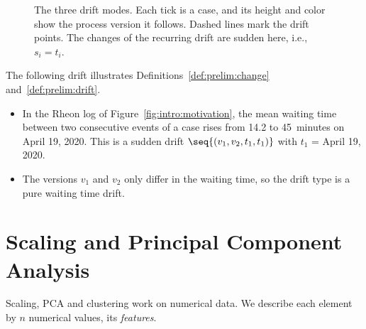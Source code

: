\begin{figure}[tb]
	\caption[The three drift modes]{%
		The three drift modes. Each tick is a case, and its height and color show the process version it follows. Dashed lines mark the drift points. The changes of the recurring drift are sudden here, i.e., $s_i = t_i$.}
	\label{fig:prelim:drift_modes}
\end{figure}

\begin{example}
	\label{ex:prelim:drift}
	The following drift illustrates Definitions~\ref{def:prelim:change} and~\ref{def:prelim:drift}.
	\begin{itemize}
		\item In the Rheon log of Figure~\ref{fig:intro:motivation}, the mean waiting time between two consecutive events of a case rises from 14.2 to 45~minutes on April 19, 2020. This is a sudden drift $\seq{(v_1, v_2, t_1, t_1)}$ with $t_1$ = April 19, 2020.

		\item The versions $v_1$ and $v_2$ only differ in the waiting time, so the drift type is a pure waiting time drift.
	\end{itemize}
\end{example}

\section{Scaling and Principal Component Analysis}
\label{sec:prelim:pca}
Scaling, PCA and clustering work on numerical data. We describe each element by $n$ numerical values, its \emph{features}.


